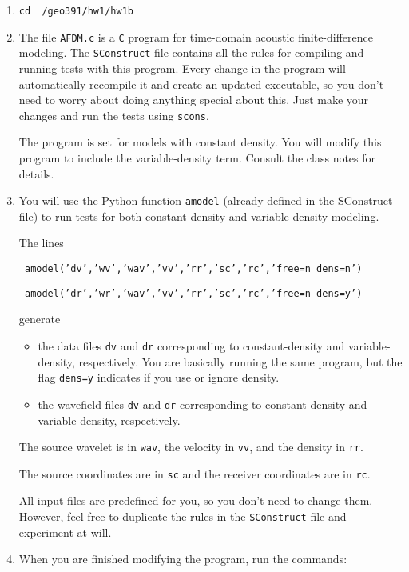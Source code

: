 \begin{enumerate}

\item \texttt{cd ~/geo391/hw1/hw1b}

\item The file \texttt{AFDM.c} is a \texttt{C} program
for time-domain acoustic finite-difference modeling.
The \texttt{SConstruct} file contains all the rules for compiling and
running tests with this program. Every change in the program will
automatically recompile it and create an updated executable,
so you don't need to worry about doing anything special about this.
Just make your changes and run the tests using \texttt{scons}.

The program is set for models with constant density.
You will modify this program to include the variable-density term.
Consult the class notes for details.

\item
You will use the Python function \texttt{amodel} (already
defined in the SConstruct file) to run tests for both constant-density
and variable-density modeling.

The lines
\par
\texttt{ amodel('dv','wv','wav','vv','rr','sc','rc','free=n dens=n') }
\par
\texttt{ amodel('dr','wr','wav','vv','rr','sc','rc','free=n dens=y') }
\par
generate
\begin{itemize}
\item the data files \texttt{dv} and \texttt{dr} 
corresponding to constant-density
and variable-density, respectively. 
You are basically running the same program, but the flag
\texttt{dens=y} indicates if you use or ignore density.

\item the wavefield files \texttt{dv} and \texttt{dr} 
corresponding to constant-density
and variable-density, respectively. 
\end{itemize}

The source wavelet is in \texttt{wav},
the velocity in \texttt{vv}, and
the density  in \texttt{rr}. 

The   source coordinates are in \texttt{sc} and
the receiver coordinates are in \texttt{rc}.

All input files are predefined for you, so you don't need to change them.
However, feel free to duplicate the rules in the \texttt{SConstruct} 
file and experiment at will.

\item
When you are finished modifying the program, run the commands:


\end{enumerate}
